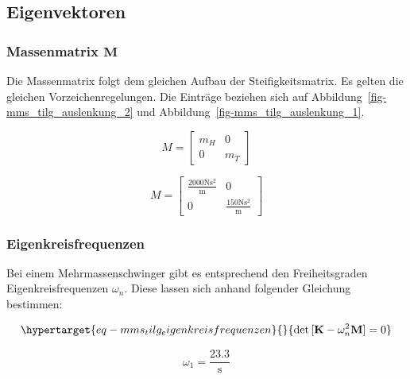 \documentclass[
  letterpaper,
  DIV=11]{scrreprt}
\begin{document}
\hypertarget{eigenvektoren-2}{%
\subsection{Eigenvektoren}\label{eigenvektoren-2}}

\hypertarget{massenmatrix-mathbfm-2}{%
\subsubsection{\texorpdfstring{Massenmatrix
\(\mathbf{M}\)}{Massenmatrix \textbackslash mathbf\{M\}}}\label{massenmatrix-mathbfm-2}}

Die Massenmatrix folgt dem gleichen Aufbau der Steifigkeitsmatrix. Es
gelten die gleichen Vorzeichenregelungen. Die Einträge beziehen sich auf
Abbildung~\ref{fig-mms_tilg_auslenkung_2} und
Abbildung~\ref{fig-mms_tilg_auslenkung_1}.

\begin{equation}M = \left[\begin{matrix}m_{H} & 0\\0 & m_{T}\end{matrix}\right]\end{equation}

\begin{equation}M = \left[\begin{matrix}\frac{2000 \text{N} \text{s}^{2}}{\text{m}} & 0\\0 & \frac{150 \text{N} \text{s}^{2}}{\text{m}}\end{matrix}\right]\end{equation}

\hypertarget{eigenkreisfrequenzen-3}{%
\subsubsection{Eigenkreisfrequenzen}\label{eigenkreisfrequenzen-3}}

Bei einem Mehrmassenschwinger gibt es entsprechend den Freiheitsgraden
Eigenkreisfrequenzen \(\omega_n\). Diese lassen sich anhand folgender
Gleichung bestimmen:

\begin{equation}\protect\hypertarget{eq-mms_tilg_eigenkreisfrequenzen}{}{
\det{[\mathbf{K}-\omega_n^2 \mathbf{M}]=0}
}\label{eq-mms_tilg_eigenkreisfrequenzen}\end{equation}

\begin{equation}\omega_{1} = \frac{23.3}{\text{s}}\end{equation}
\end{document}
